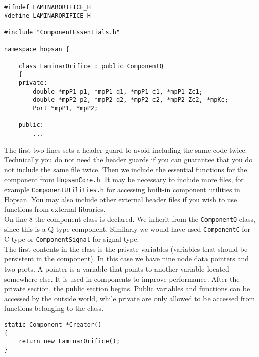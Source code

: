 \documentclass[a4paper,pdftex]{article}
\begin{document}
\begin{minipage}{\linewidth}
\begin{lstlisting}[basicstyle=\footnotesize\ttfamily]
#ifndef LAMINARORIFICE_H
#define LAMINARORIFICE_H

#include "ComponentEssentials.h"

namespace hopsan {

    class LaminarOrifice : public ComponentQ
    {
    private:
        double *mpP1_p1, *mpP1_q1, *mpP1_c1, *mpP1_Zc1;
        double *mpP2_p2, *mpP2_q2, *mpP2_c2, *mpP2_Zc2, *mpKc;
        Port *mpP1, *mpP2;
       
    public:
        ...
\end{lstlisting}
\end{minipage}

\noindent The first two lines sets a header guard to avoid including the same code twice. 
Technically you do not need the header guards if you can guarantee that you do not include the same file twice. 
Then we include the essential functions for the component from \texttt{HopsanCore.h}. 
It may be necessary to include more files, for example \texttt{ComponentUtilities.h} for accessing built-in component utilities in Hopsan. 
You may also include other external header files if you wish to use functions from external libraries.\\
\newline
On line 8 the component class is declared. 
We inherit from the \texttt{ComponentQ} class, since this is a Q-type component. 
Similarly we would have used \texttt{ComponentC} for C-type or \texttt{ComponentSignal} for signal type.\\ 
\newline
The first contents in the class is the private variables (variables that should be persistent in the component). 
In this case we have nine node data pointers and two ports.
A pointer is a variable that points to another variable located somewhere else.
It is used in components to improve performance.
After the private section, the public section begins. 
Public variables and functions can be accessed by the outside world, while private are only allowed to be accessed from functions belonging to the class.

\begin{minipage}{\linewidth}
\begin{lstlisting}[firstnumber=17, basicstyle=\footnotesize\ttfamily]
static Component *Creator()
{
    return new LaminarOrifice();
}
\end{lstlisting}
\end{minipage}
\end{document}
